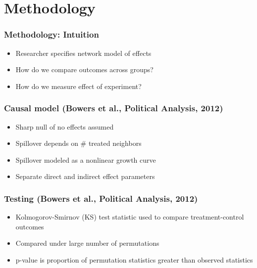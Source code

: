 \documentclass{beamer}
\begin{document}
\section{Methodology}

\begin{frame}
\frametitle{Methodology: Intuition}
\begin{itemize}
\item {\LARGE Researcher specifies network model of effects}
\vspace{5mm}
\item {\LARGE How do we compare outcomes across groups?}
\vspace{5mm}
\item {\LARGE How do we measure effect of experiment?}
\end{itemize}
\end{frame}


\begin{frame}
\frametitle{Causal model (Bowers et al., Political Analysis, 2012)}
\begin{itemize}
\item {\LARGE Sharp null of no effects assumed}
\vspace{5mm}
\item {\LARGE Spillover depends on \# treated neighbors}
\vspace{5mm}
\item {\LARGE Spillover modeled as a nonlinear growth curve}
\vspace{5mm}
\item {\LARGE Separate direct and indirect effect parameters}
\end{itemize}
\end{frame}


\begin{frame}
\frametitle{Testing (Bowers et al., Political Analysis, 2012)}
\begin{itemize}
\item {\LARGE Kolmogorov-Smirnov (KS) test statistic used to compare treatment-control outcomes}
\vspace{5mm}
\item {\LARGE Compared under large number of permutations}
\vspace{5mm}
\item {\LARGE p-value is proportion of permutation statistics greater than observed statistics}
\end{itemize}
\end{frame}
\end{document}
